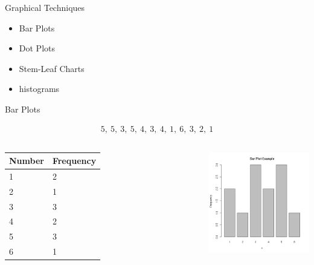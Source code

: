 \begin{frame}{Graphical Techniques}

  \begin{itemize}
  \item Bar Plots
  \item Dot Plots
  \item Stem-Leaf Charts
  \item histograms
  \end{itemize}
  
\end{frame}


\begin{frame}{Bar Plots}

  \begin{eqnarray*}
    5,~5,~3,~5,~4,~3,~4,~1,~6,~3,~2,~1
  \end{eqnarray*}


  \begin{columns}


    \begin{tabular}{l|l}
      Number  & Frequency \\ \hline
      1 & 2 \\
      2 & 1 \\
      3 & 3 \\
      4 & 2 \\
      5 & 3 \\
      6 & 1 
    \end{tabular}


    \includegraphics[width=7cm]{img/barplotExample}


  \end{columns}
  
  
\end{frame}


